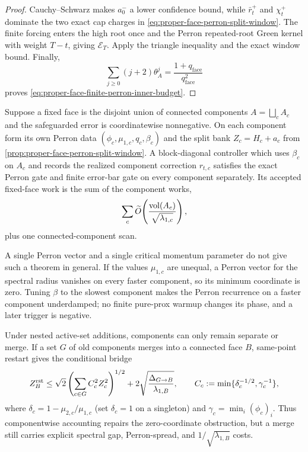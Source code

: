 \documentclass[11pt]{article}
\begin{document}
\begin{proof}
Cauchy--Schwarz makes $a_0^-$ a lower confidence bound, while
$\bar r_t^+$ and $\chi_t^+$ dominate the two exact cap charges in
\cref{eq:proper-face-perron-split-window}.  The finite forcing enters the
high root once and the Perron repeated-root Green kernel with weight $T-t$,
giving $\mathcal E_T$.  Apply the triangle inequality and the exact window
bound.  Finally,
\begin{equation*}
 \sum_{j\geq0}(j+2)\theta_A^j=\frac{1+q_{\mathrm{face}}}{q_{\mathrm{face}}^2}
\end{equation*}
proves
\cref{eq:proper-face-finite-perron-inner-budget}.
\end{proof}

\begin{proposition}
\label{prop:proper-face-componentwise-perron}
Suppose a fixed face is the disjoint union of connected components
$A=\bigsqcup_c A_c$ and the safeguarded error is coordinatewise nonnegative.
On each component form its own Perron data
$(\phi_c,\mu_{1,c},q_c,\beta_c)$ and the split bank $Z_c=H_c+a_c$ from
\cref{prop:proper-face-perron-split-window}.  A block-diagonal controller
which uses $\beta_c$ on $A_c$ and records the realized component correction
$r_{t,c}$ satisfies the exact Perron gate and finite error-bar gate on every
component separately.  Its accepted fixed-face work is the sum of the
component works,
\begin{equation*}
 \sum_c\widetilde O\!\left(
   \frac{\operatorname{vol}(A_c)}{\sqrt{\lambda_{1,c}}}\right),
\end{equation*}
plus one connected-component scan.

A single Perron vector and a single critical momentum parameter do not give
such a theorem in general.  If the values $\mu_{1,c}$ are unequal, a Perron
vector for the spectral radius vanishes on every faster component, so its
minimum coordinate is zero.  Tuning $\beta$ to the slowest component makes
the Perron recurrence on a faster component underdamped; no finite
pure-prox warmup changes its phase, and a later trigger is negative.

Under nested active-set additions, components can only remain separate or
merge.  If a set $G$ of old components merges into a connected face $B$,
same-point restart gives the conditional bridge
\begin{equation}
 Z_B^{\rm rst}
 \leq\sqrt2\left(\sum_{c\in G}C_c^2Z_c^2\right)^{1/2}
 +2\sqrt{\frac{\Delta_{G\to B}}{\lambda_{1,B}}},
 \qquad
 C_c:=\min\{\delta_c^{-1/2},\gamma_c^{-1}\},
 \label{eq:proper-face-component-merge}
\end{equation}
where
$\delta_c=1-\mu_{2,c}/\mu_{1,c}$ (set $\delta_c=1$ on a singleton) and
$\gamma_c=\min_i(\phi_c)_i$.  Thus componentwise accounting repairs the
zero-coordinate obstruction, but a merge still carries explicit spectral
gap, Perron-spread, and $1/\sqrt{\lambda_{1,B}}$ costs.
\end{proposition}
\end{document}
